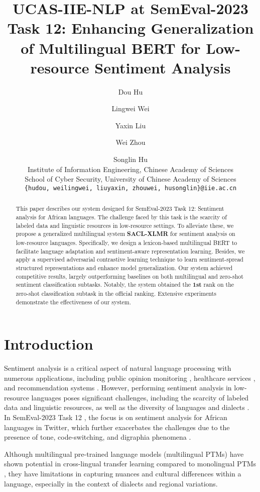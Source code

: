 \documentclass[11pt]{article}
\title{UCAS-IIE-NLP at SemEval-2023 Task 12: Enhancing Generalization of Multilingual BERT for Low-resource Sentiment Analysis}
\author{Dou Hu 
        \and Lingwei Wei
        \and Yaxin Liu
        \and Wei Zhou
        \and Songlin Hu
         \\
         Institute of Information Engineering, Chinese Academy of Sciences \\
         School of Cyber Security, University of Chinese Academy of Sciences  \\
        \texttt{\{hudou, weilingwei, liuyaxin, zhouwei, husonglin\}@iie.ac.cn} \\
}
\begin{document}
\maketitle
\begin{abstract}

This paper describes our system designed for SemEval-2023 Task 12: Sentiment analysis for African languages. The challenge faced by this task is the scarcity of labeled data and linguistic resources in low-resource settings. To alleviate these, we propose a generalized multilingual system \textbf{SACL-XLMR} for sentiment analysis on low-resource languages. Specifically, we design a lexicon-based multilingual BERT to facilitate language adaptation and sentiment-aware representation learning. 
Besides, we apply a supervised adversarial contrastive learning technique to learn sentiment-spread structured representations and enhance model generalization. Our system achieved competitive results, largely outperforming baselines on both multilingual and zero-shot sentiment classification subtasks. Notably, the system obtained the \textbf{1st} rank on the zero-shot classification subtask in the official ranking. Extensive experiments demonstrate the effectiveness of our system.

\end{abstract}

\section{Introduction}


Sentiment analysis is a critical aspect of natural language processing with numerous applications, including public opinion monitoring \citep{info:doi/10.2196/21978}, healthcare services \citep{info:doi/10.2196/16023}, and recommendation systems \citep{DBLP:conf/ksem/HuWZHFH21}. However, performing sentiment analysis in low-resource languages poses significant challenges, including the scarcity of labeled data and linguistic resources, as well as the diversity of languages and dialects \citep{DBLP:journals/air/LoCCC17,DBLP:journals/fgcs/OueslatiCHO20}. In SemEval-2023 Task 12 \citep{muhammadSemEval2023}, the focus is on sentiment analysis for African languages in Twitter, which further exacerbates the challenges due to the presence of tone, code-switching, and digraphia phenomena \cite{adebara-abdul-mageed-2022-towards}.

Although multilingual pre-trained language models (multilingual PTMs) \citep{DBLP:conf/nips/ConneauL19,DBLP:conf/acl/ConneauKGCWGGOZ20} have shown potential in cross-lingual transfer learning compared to monolingual PTMs \citep{DBLP:conf/naacl/DevlinCLT19,DBLP:conf/emnlp/0001HDZJMS22}, they have limitations in capturing nuances and cultural differences within a language, especially in the context of dialects and regional variations.
\end{document}
